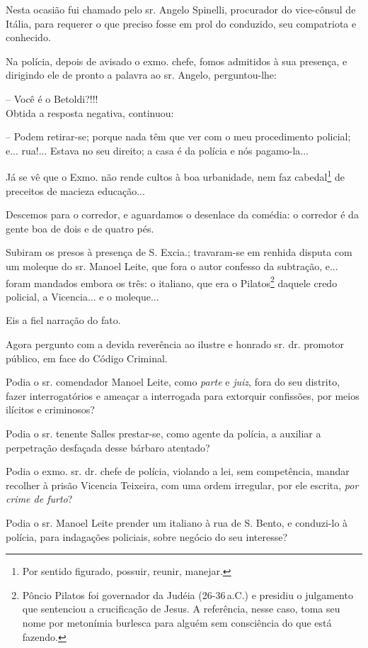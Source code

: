{Nesta ocasião fui chamado pelo sr. Angelo Spinelli, procurador do
vice-cônsul de Itália, para requerer o que preciso fosse em prol do
conduzido, seu compatriota e conhecido.

Na polícia, depois de avisado o exmo. chefe, fomos admitidos à sua
presença, e dirigindo ele de pronto a palavra ao sr. Angelo,
perguntou-lhe:

-- Você é o Betoldi?!!!\\
Obtida a resposta negativa, continuou:

-- Podem retirar-se; porque nada têm que ver com o meu procedimento
policial; e... rua!... Estava no seu direito; a casa é da polícia e nós
pagamo-la...

Já se vê que o Exmo. não rende cultos à boa urbanidade, nem faz
cabedal\footnote{ Por sentido figurado, possuir, reunir, manejar.} de
preceitos de macieza educação...

Descemos para o corredor, e aguardamos o desenlace da comédia: o
corredor é da gente boa de dois e de quatro pés.

Subiram os presos à presença de S. Excia.; travaram-se em renhida
disputa com um moleque do sr. Manoel Leite, que fora o autor confesso da
subtração, e... foram mandados embora os três: o italiano, que era o
Pilatos\footnote{ Pôncio Pilatos foi governador da Judéia (26-36\,a.C.) e
  presidiu o julgamento que sentenciou a crucificação de Jesus. A
  referência, nesse caso, toma seu nome por metonímia burlesca para
  alguém sem consciência do que está fazendo.} daquele credo policial, a
Vicencia... e o moleque...

Eis a fiel narração do fato.

Agora pergunto com a devida reverência ao ilustre e honrado sr. dr.
promotor público, em face do Código Criminal.

Podia o sr. comendador Manoel Leite, como \emph{parte} e \emph{juiz},
fora do seu distrito, fazer interrogatórios e ameaçar a interrogada para
extorquir confissões, por meios ilícitos e criminosos?

Podia o sr. tenente Salles prestar-se, como agente da polícia, a
auxiliar a perpetração desfaçada desse bárbaro atentado?

Podia o exmo. sr. dr. chefe de polícia, violando a lei, sem competência,
mandar recolher à prisão Vicencia Teixeira, com uma ordem irregular, por
ele escrita, \emph{por crime de furto}?

Podia o sr. Manoel Leite prender um italiano à rua de S. Bento, e
conduzi-lo à polícia, para indagações policiais, sobre negócio do seu
interesse?

}
